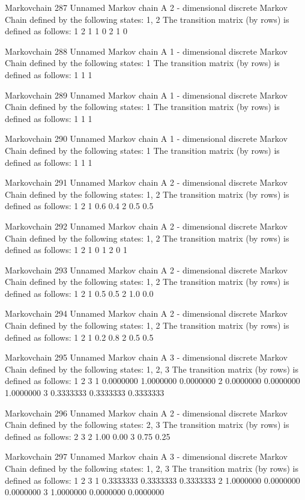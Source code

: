 \documentclass[
  nojss]{jss}
\begin{document}
\begin{CodeChunk}
\begin{CodeOutput}
Markovchain  287 
Unnamed Markov chain 
 A  2 - dimensional discrete Markov Chain defined by the following states: 
 1, 2 
 The transition matrix  (by rows)  is defined as follows: 
  1 2
1 1 0
2 1 0

Markovchain  288 
Unnamed Markov chain 
 A  1 - dimensional discrete Markov Chain defined by the following states: 
 1 
 The transition matrix  (by rows)  is defined as follows: 
  1
1 1

Markovchain  289 
Unnamed Markov chain 
 A  1 - dimensional discrete Markov Chain defined by the following states: 
 1 
 The transition matrix  (by rows)  is defined as follows: 
  1
1 1

Markovchain  290 
Unnamed Markov chain 
 A  1 - dimensional discrete Markov Chain defined by the following states: 
 1 
 The transition matrix  (by rows)  is defined as follows: 
  1
1 1

Markovchain  291 
Unnamed Markov chain 
 A  2 - dimensional discrete Markov Chain defined by the following states: 
 1, 2 
 The transition matrix  (by rows)  is defined as follows: 
    1   2
1 0.6 0.4
2 0.5 0.5

Markovchain  292 
Unnamed Markov chain 
 A  2 - dimensional discrete Markov Chain defined by the following states: 
 1, 2 
 The transition matrix  (by rows)  is defined as follows: 
  1 2
1 0 1
2 0 1

Markovchain  293 
Unnamed Markov chain 
 A  2 - dimensional discrete Markov Chain defined by the following states: 
 1, 2 
 The transition matrix  (by rows)  is defined as follows: 
    1   2
1 0.5 0.5
2 1.0 0.0

Markovchain  294 
Unnamed Markov chain 
 A  2 - dimensional discrete Markov Chain defined by the following states: 
 1, 2 
 The transition matrix  (by rows)  is defined as follows: 
    1   2
1 0.2 0.8
2 0.5 0.5

Markovchain  295 
Unnamed Markov chain 
 A  3 - dimensional discrete Markov Chain defined by the following states: 
 1, 2, 3 
 The transition matrix  (by rows)  is defined as follows: 
          1         2         3
1 0.0000000 1.0000000 0.0000000
2 0.0000000 0.0000000 1.0000000
3 0.3333333 0.3333333 0.3333333

Markovchain  296 
Unnamed Markov chain 
 A  2 - dimensional discrete Markov Chain defined by the following states: 
 2, 3 
 The transition matrix  (by rows)  is defined as follows: 
     2    3
2 1.00 0.00
3 0.75 0.25

Markovchain  297 
Unnamed Markov chain 
 A  3 - dimensional discrete Markov Chain defined by the following states: 
 1, 2, 3 
 The transition matrix  (by rows)  is defined as follows: 
          1         2         3
1 0.3333333 0.3333333 0.3333333
2 1.0000000 0.0000000 0.0000000
3 1.0000000 0.0000000 0.0000000


\end{CodeOutput}
\end{CodeChunk}
\end{document}

